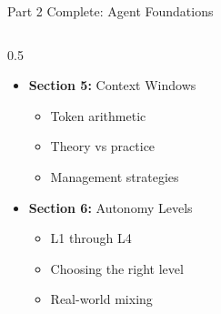 \documentclass[aspectratio=169, 11pt]{beamer}
\begin{document}
\begin{frame}{Part 2 Complete: Agent Foundations}
\begin{columns}[T]
\begin{column}{0.5\textwidth}
\begin{itemize}
                \item \textbf{Section 5:} Context Windows
                \begin{itemize}
                    \footnotesize
                    \item Token arithmetic
                    \item Theory vs practice
                    \item Management strategies
                \end{itemize}

                \item \textbf{Section 6:} Autonomy Levels
                \begin{itemize}
                    \footnotesize
                    \item L1 through L4
                    \item Choosing the right level
                    \item Real-world mixing
                \end{itemize}
            \end{itemize}
        \end{column}
    \end{columns}

\end{frame}
\end{document}
